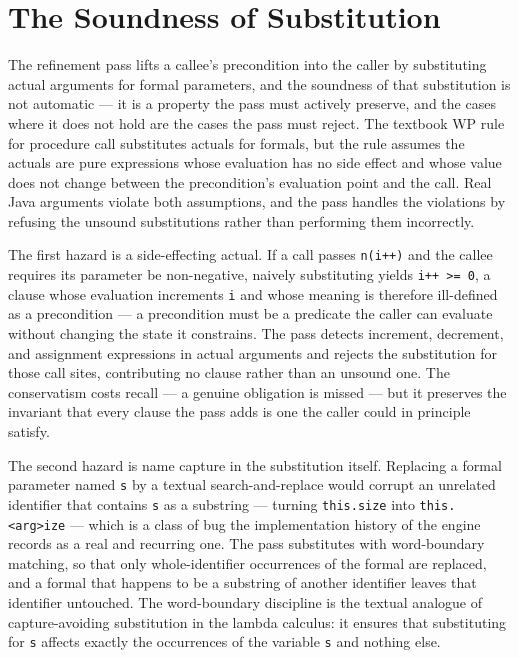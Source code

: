 \section{The Soundness of Substitution}
\label{sec:comp-substitution}

The refinement pass lifts a callee's precondition into the caller by substituting
actual arguments for formal parameters, and the soundness of that substitution is
not automatic --- it is a property the pass must actively preserve, and the cases
where it does not hold are the cases the pass must reject. The textbook WP rule
for procedure call substitutes actuals for formals, but the rule assumes the
actuals are pure expressions whose evaluation has no side effect and whose value
does not change between the precondition's evaluation point and the call. Real
Java arguments violate both assumptions, and the pass handles the violations by
refusing the unsound substitutions rather than performing them incorrectly.

The first hazard is a side-effecting actual. If a call passes \texttt{n(i++)} and
the callee requires its parameter be non-negative, naively substituting yields
\texttt{i++ >= 0}, a clause whose evaluation increments \texttt{i} and whose
meaning is therefore ill-defined as a precondition --- a precondition must be a
predicate the caller can evaluate without changing the state it constrains. The
pass detects increment, decrement, and assignment expressions in actual arguments
and rejects the substitution for those call sites, contributing no clause rather
than an unsound one. The conservatism costs recall --- a genuine obligation is
missed --- but it preserves the invariant that every clause the pass adds is one
the caller could in principle satisfy.

The second hazard is name capture in the substitution itself. Replacing a formal
parameter named \texttt{s} by a textual search-and-replace would corrupt an
unrelated identifier that contains \texttt{s} as a substring --- turning
\texttt{this.size} into \texttt{this.<arg>ize} --- which is a class of bug the
implementation history of the engine records as a real and recurring one. The
pass substitutes with word-boundary matching, so that only whole-identifier
occurrences of the formal are replaced, and a formal that happens to be a
substring of another identifier leaves that identifier untouched. The
word-boundary discipline is the textual analogue of capture-avoiding substitution
in the lambda calculus: it ensures that substituting for \texttt{s} affects
exactly the occurrences of the variable \texttt{s} and nothing else.

